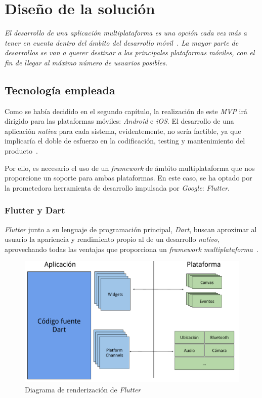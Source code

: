 \chapter{Diseño de la solución}
\textit{El desarrollo de una aplicación multiplataforma es una opción cada vez más a tener en 
cuenta dentro del ámbito del desarrollo móvil~\cite{10.1145/3241739}. La mayor parte de desarrollos
se van a querer destinar a las principales plataformas móviles, 
con el fin de llegar al máximo número de usuarios posibles.
}

\section{Tecnología empleada}
Como se había decidido en el segundo capítulo, la realización de este \textit{MVP} irá dirigido para las
plataformas móviles: \textit{Android} e \textit{iOS}. El desarrollo de una aplicación \textit{nativa} para 
cada sistema, evidentemente, no sería factible, ya que implicaría el doble de esfuerzo en la codificación,
testing y mantenimiento del producto~\cite{10.1145/2480362.2480464}.

Por ello, es necesario el uso de un \textit{framework} de ámbito multiplataforma que nos proporcione un
soporte para ambas plataformas. En este caso, se ha optado por la prometedora herramienta de desarrollo
impulsada por \textit{Google}: \textit{Flutter}.

\subsection{Flutter y Dart}
\textit{Flutter} junto a su lenguaje de programación principal, \textit{Dart}, buscan 
aproximar al usuario la apariencia y rendimiento 
propio al de un desarrollo \textit{nativo}, aprovechando todas las ventajas que proporciona 
un \textit{framework multiplataforma}~\cite{7934674}.

\begin{figure}[H]
    \centering
    \includegraphics[scale=0.45]{images/flutter1.pdf}
    \caption{Diagrama de renderización de \textit{Flutter}\cite{leler2019s}}
    \label{fig:flutter1}
  \end{figure}

